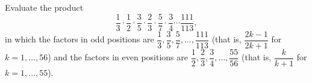 Evaluate the product
\[\dfrac13\cdot\dfrac12\cdot\dfrac35\cdot\dfrac23\cdot\dfrac57\cdot\dfrac34\cdots\dfrac{111}{113},\]
in which the factors in odd positions are $\dfrac13,\dfrac35,\dfrac57,\dots,\dfrac{111}{113}$ (that is, $\dfrac{2k-1}{2k+1}$ for $k=1,\dots,56$) and the factors in even positions are $\dfrac12,\dfrac23,\dfrac34,\dots,\dfrac{55}{56}$ (that is, $\dfrac{k}{k+1}$ for $k=1,\dots,55$).
